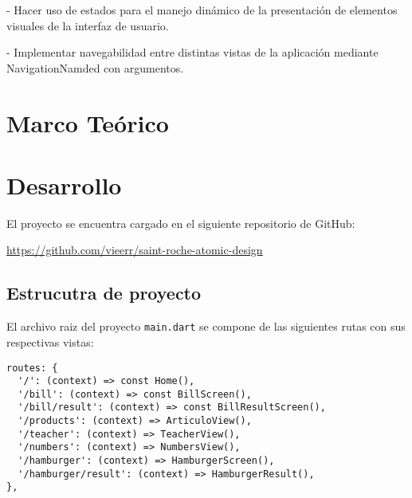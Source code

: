 \documentclass[12pt,letterpaper]{article}
\begin{document}
- Hacer uso de estados para el manejo dinámico de la presentación de elementos visuales de la interfaz de usuario.

- Implementar navegabilidad entre distintas vistas de la aplicación mediante NavigationNamded con argumentos.


\section{Marco Teórico}



\section{Desarrollo}

El proyecto se encuentra cargado en el siguiente repositorio de GitHub: 

\href{https://github.com/vieerr/saint-roche-atomic-design}{\color{blue}\underline{https://github.com/vieerr/saint-roche-atomic-design}}

\subsection{Estrucutra de proyecto}

El archivo raiz del proyecto \lstinline{main.dart} se compone de las siguientes rutas con sus respectivas vistas:

\begin{center}
\begin{lstlisting}
routes: {
  '/': (context) => const Home(),
  '/bill': (context) => const BillScreen(),
  '/bill/result': (context) => const BillResultScreen(),
  '/products': (context) => ArticuloView(),
  '/teacher': (context) => TeacherView(),
  '/numbers': (context) => NumbersView(),
  '/hamburger': (context) => HamburgerScreen(),
  '/hamburger/result': (context) => HamburgerResult(),
},
\end{lstlisting}
\end{center}
\end{document}
